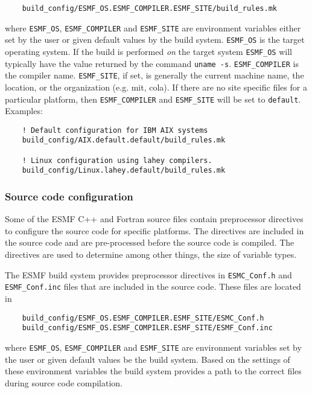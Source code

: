 \begin{verbatim}
    build_config/ESMF_OS.ESMF_COMPILER.ESMF_SITE/build_rules.mk
\end{verbatim}

where {\tt ESMF\_OS}, {\tt ESMF\_COMPILER} and {\tt ESMF\_SITE} are environment
variables either set by the user or given default values by the build
system. {\tt ESMF\_OS} is the target operating system. If the build is performed
{\em on} the target system {\tt ESMF\_OS} will typically have the value
returned by the command {\tt uname -s}. {\tt ESMF\_COMPILER} is the compiler
name. {\tt ESMF\_SITE}, if set, is generally the current machine name, the
location, or the organization (e.g. mit, cola).  If there are no site specific
files for a particular platform, then {\tt ESMF\_COMPILER} and {\tt ESMF\_SITE}
will be set to {\tt default}.  Examples:

\begin{verbatim}
    ! Default configuration for IBM AIX systems
    build_config/AIX.default.default/build_rules.mk
    
    ! Linux configuration using lahey compilers.    
    build_config/Linux.lahey.default/build_rules.mk
\end{verbatim}

\subsubsection{Source code configuration}

Some of the ESMF C++ and Fortran source files contain preprocessor directives
to configure the source code for specific platforms.  The directives are 
included in the source code and are pre-processed before the source code is 
compiled.  The directives are used to determine among other things, the size 
of variable types.

The ESMF build system provides preprocessor directives in 
{\tt ESMC\_Conf.h} and {\tt ESMF\_Conf.inc} files
that are included in the source code. These files are located in

\begin{verbatim}
    build_config/ESMF_OS.ESMF_COMPILER.ESMF_SITE/ESMC_Conf.h
    build_config/ESMF_OS.ESMF_COMPILER.ESMF_SITE/ESMF_Conf.inc
\end{verbatim}

where {\tt ESMF\_OS}, {\tt ESMF\_COMPILER} and {\tt ESMF\_SITE} are
environment variables set by the user or given default values be the
build system.  Based on the settings of these environment variables
the build system provides a path to the correct files during
source code compilation.

